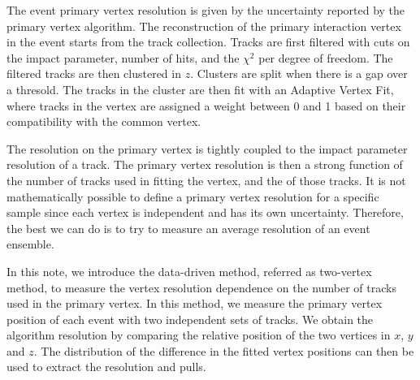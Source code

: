 The event primary vertex resolution is given by the uncertainty 
reported by the primary vertex algorithm. 
The reconstruction of the primary interaction vertex~\cite{pvtxreco} in
the event starts from the track collection.  Tracks are
first filtered with cuts on the impact parameter, number
of hits, and the $\chi^2$ per degree of freedom.  The
filtered tracks are then clustered in $z$.  Clusters are
split when there is a gap over a thresold. The tracks in the
cluster are then fit with an Adaptive Vertex Fit, where
tracks in the vertex are assigned a weight between 0 and 1
based on their compatibility with the common vertex.

The resolution on the primary vertex is tightly coupled to the impact
parameter resolution of a track. The primary vertex resolution is then
a strong function of the number of tracks used in fitting the vertex,
and the \pt of those tracks. 
It is not mathematically possible to define a primary vertex resolution 
for a specific sample since each vertex is independent and 
has its own uncertainty. 
Therefore, the best we can do is to try to measure an average 
resolution of an event ensemble.

In this note, we introduce the data-driven method, referred as two-vertex 
method, to measure the vertex resolution dependence on the 
number of tracks used in the primary vertex. 
In this method, we measure the primary vertex position of each event 
with two independent sets of tracks. 
We obtain the algorithm resolution by comparing the 
relative position of the two vertices in $x$, $y$ and $z$. 
The distribution of the difference in the fitted vertex positions 
can then be used to extract the resolution and pulls. 

